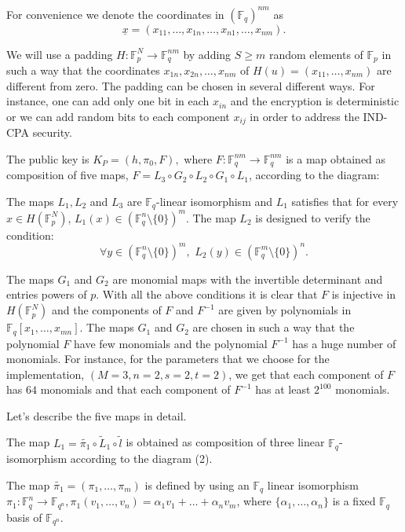 \documentclass[12pt,a4paper]{amsart}
\theoremstyle{remark}
\theoremstyle{definition}
\newcommand\gfq{\mathbb{F}_q}
\begin{document}
For convenience we denote the coordinates in  $(\gfq)^{nm}$ as 
\[
\underline{x}=(x_{11},\ldots,x_{1n},\ldots, x_{n1},\ldots,  x_{nm}).
\] 


We will use  a padding $H:\mathbb{F}_p^N\to \mathbb{F}_q^{nm}$ by adding $S\geq m$ random elements of $\mathbb{F}_p $ in such a way 
that the coordinates $x_{1n},x_{2n},\ldots, x_{nm}$ of $H(u)=(x_{11},\ldots ,x_{nm})$  
are different from zero. The padding can be chosen in several different ways. For instance, one can add only one bit in each $x_{in}$
and the encryption is deterministic or we can add random bits to each component $x_{ij}$ in order to address the IND-CPA security.   

\newpage


The public key is $K_P=(h, \pi_0,F),$  where $F: \mathbb{F}_	q^{nm}\to \mathbb{F}_	q^{nm}$ 
is a map obtained as  composition of five maps, $F=L_3 \circ G_2 \circ L_2 \circ G_1 \circ L_1$, 
according to the diagram:
\begin{center}

\end{center}

The maps $L_1, L_2$ and $L_3$ are $\mathbb{F}_	q$-linear isomorphism and 
$L_1$ satisfies that  for every $x\in H( \mathbb{F}_p^N )$, $L_1(x)\in(\mathbb{F}_q^n
\setminus \{0\})^m$. The map $L_2$ is designed to verify the condition:
$$
\forall y\in (\mathbb{F}_q^n\setminus \{0\})^m,    \,\, L_2(y) 
\in (\mathbb{F}_q^m\setminus \{0\})^n.
$$

The maps $G_1$ and $G_2$ are monomial maps with the invertible determinant and entries  
powers of $p.$  With all the above conditions it is clear that $F$ is injective in $H(\mathbb{F}_p^N)$ 
and the components of $F$ and $F^{-1}$ 
are  given by polynomials in $\mathbb{F}_q [x_1,\ldots, x_{mn}]$. 
The maps $G_1$ and $G_2$ are chosen in such a way that the polynomial 
$F$ have few monomials and the polynomial $F^{-1}$ has a  huge number of monomials. 
For instance,  for the parameters that we choose for the implementation, $(M=3, n=2, s=2, t=2)$, 
we get that each component of $F$ has $64$ monomials and that each component of $F^{-1}$ 
has at least $2^{100}$ monomials.

Let's  describe the five maps in detail. 

The map $L_1=\tilde{\pi_1}\circ \tilde{L}_1\circ \tilde{ l} $  
is obtained as composition of three linear $\mathbb{F}_q$-isomorphism  according to the diagram 
(2).
\begin{center}

\end{center}The map $\tilde{\pi_1}=(\pi_1,\ldots,\pi_m)$ is defined by using an 
$\mathbb{F}_q$ linear isomorphism 
$\pi_1: \mathbb{F}_q^n \to \mathbb{F}_{q^n}, \pi_1(v_1, \ldots, v_n)=\alpha_1 v_1+ \ldots+\alpha_n v_m$,
where  $\{ \alpha_1,\ldots,\alpha_n\}$ is a fixed $\mathbb{F}_q$  basis of $\mathbb{F}_{q^n}.$
\end{document}
